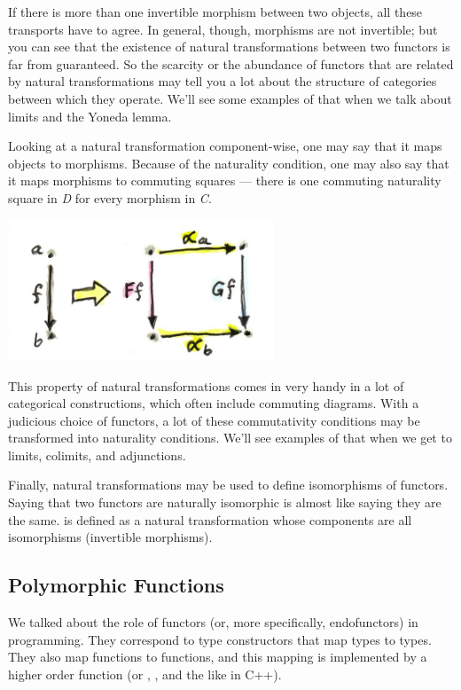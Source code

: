 If there is more than one invertible morphism between two objects, all
these transports have to agree. In general, though, morphisms are not
invertible; but you can see that the existence of natural
transformations between two functors is far from guaranteed. So the
scarcity or the abundance of functors that are related by natural
transformations may tell you a lot about the structure of categories
between which they operate. We'll see some examples of that when we talk
about limits and the Yoneda lemma.

Looking at a natural transformation component-wise, one may say that it
maps objects to morphisms. Because of the naturality condition, one may
also say that it maps morphisms to commuting squares --- there is one
commuting naturality square in \emph{D} for every morphism in \emph{C}.

\includegraphics[width=3.12500in]{images/naturality.jpg}

This property of natural transformations comes in very handy in a lot of
categorical constructions, which often include commuting diagrams. With
a judicious choice of functors, a lot of these commutativity conditions
may be transformed into naturality conditions. We'll see examples of
that when we get to limits, colimits, and adjunctions.

Finally, natural transformations may be used to define isomorphisms of
functors. Saying that two functors are naturally isomorphic is almost
like saying they are the same.  is defined as
a natural transformation whose components are all isomorphisms
(invertible morphisms).

\subsection{Polymorphic Functions}\label{polymorphic-functions}

We talked about the role of functors (or, more specifically,
endofunctors) in programming. They correspond to type constructors that
map types to types. They also map functions to functions, and this
mapping is implemented by a higher order function  (or
, , and the like in C++).

